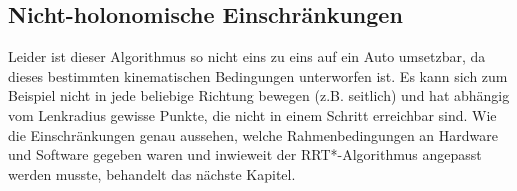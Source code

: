 \subsection{Nicht-holonomische Einschränkungen}
Leider ist dieser Algorithmus so nicht eins zu eins auf ein Auto umsetzbar, da dieses bestimmten kinematischen Bedingungen unterworfen ist. Es kann sich zum Beispiel nicht in jede beliebige Richtung bewegen (z.B. seitlich) und hat abhängig vom Lenkradius gewisse Punkte, die nicht in einem Schritt erreichbar sind. Wie die Einschränkungen genau aussehen, welche Rahmenbedingungen an Hardware und Software gegeben waren und inwieweit der RRT*-Algorithmus angepasst werden musste, behandelt das nächste Kapitel.